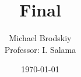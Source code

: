 


\title{Final}
\date{\today}
\author{Michael Brodskiy\\ \small Professor: I. Salama}



\maketitle

